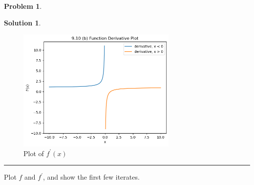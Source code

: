 \documentclass{article}
\theoremstyle{definition}
\newtheorem{problem}{Problem}
\def\fline{\rule{0.75\linewidth}{0.5pt}}
\newcommand{\finishline}{\begin{center}\fline\end{center}}
\newtheorem*{solution*}{Solution}
\newenvironment{solution}{\begin{solution*}}{{\finishline} \end{solution*}}
\begin{document}
\begin{problem}
\begin{enumerate}
\begin{solution}
\begin{figure}[h!]
        \centering
        \includegraphics[width=0.7\textwidth]{HW5-9-10(b)-Derivative.png}
        \caption{Plot of $f^{'}(x)$}
    \end{figure}  
    
    \end{solution}
    
\end{enumerate}

Plot $f$ and $f^{'}$, and show the first few iterates.
\end{problem}
\end{document}

